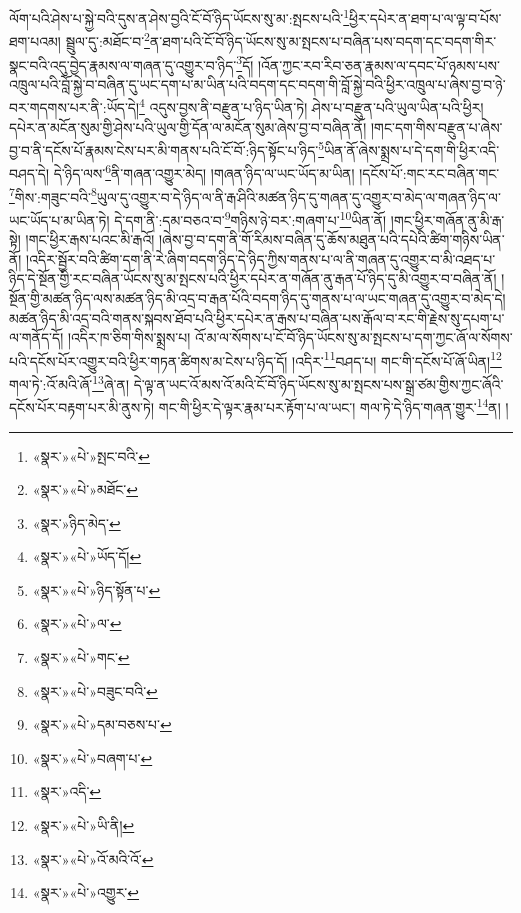 ལོག་པའི་ཤེས་པ་སྐྱེ་བའི་དུས་ན་ཤེས་བྱའི་ངོ་བོ་ཉིད་ཡོངས་སུ་མ་:སྤངས་པའི་\footnote{«སྣར་»«པེ་»སྤང་བའི་}ཕྱིར་དཔེར་ན་ཐག་པ་ལ་ལྟ་བ་པོས་ཐག་པའམ། སྦྲུལ་དུ་:མཐོང་བ་\footnote{«སྣར་»«པེ་»མཐོང་}ན་ཐག་པའི་ངོ་བོ་ཉིད་ཡོངས་སུ་མ་སྤངས་པ་བཞིན་པས་བདག་དང་བདག་གིར་སྣང་བའི་འདུ་བྱེད་རྣམས་ལ་གཞན་དུ་འགྱུར་བ་ཉིད་\footnote{«སྣར་»ཉིད་མེད་}དོ། །འོན་ཀྱང་རབ་རིབ་ཅན་རྣམས་ལ་དབང་པོ་ཉམས་པས་འཁྲུལ་པའི་བློ་སྐྱེ་བ་བཞིན་དུ་ཡང་དག་པ་མ་ཡིན་པའི་བདག་དང་བདག་གི་བློ་སྐྱེ་བའི་ཕྱིར་འཁྲུལ་པ་ཞེས་བྱ་བ་ཉེ་བར་གདགས་པར་ནི་:ཡོད་དེ།\footnote{«སྣར་»«པེ་»ཡོད་དོ།} འདུས་བྱས་ནི་བརྫུན་པ་ཉིད་ཡིན་ཏེ། ཤེས་པ་བརྫུན་པའི་ཡུལ་ཡིན་པའི་ཕྱིར། དཔེར་ན་མངོན་སུམ་གྱི་ཤེས་པའི་ཡུལ་གྱི་དོན་ལ་མངོན་སུམ་ཞེས་བྱ་བ་བཞིན་ནོ། །གང་དག་གིས་བརྫུན་པ་ཞེས་བྱ་བ་ནི་དངོས་པོ་རྣམས་ངེས་པར་མི་གནས་པའི་ངོ་བོ་:ཉིད་སྟོང་པ་ཉིད་\footnote{«སྣར་»«པེ་»ཉིད་སྟོན་པ་}ཡིན་ནོ་ཞེས་སྨྲས་པ་དེ་དག་གི་ཕྱིར་འདི་བཤད་དེ། དེ་ཉིད་ལས་\footnote{«སྣར་»«པེ་»ལ་}ནི་གཞན་འགྱུར་མེད། །གཞན་ཉིད་ལ་ཡང་ཡོད་མ་ཡིན། །དངོས་པོ་:གང་རང་བཞིན་གང་\footnote{«སྣར་»«པེ་»གང་}གིས་:གཟུང་བའི་\footnote{«སྣར་»«པེ་»བཟུང་བའི་}ཡུལ་དུ་འགྱུར་བ་དེ་ཉིད་ལ་ནི་རྒ་ཤིའི་མཚན་ཉིད་དུ་གཞན་དུ་འགྱུར་བ་མེད་ལ་གཞན་ཉིད་ལ་ཡང་ཡོད་པ་མ་ཡིན་ཏེ། དེ་དག་ནི་:དམ་བཅའ་བ་\footnote{«སྣར་»«པེ་»དམ་བཅས་པ་}གཉིས་ཉེ་བར་:གཞག་པ་\footnote{«སྣར་»«པེ་»བཞག་པ་}ཡིན་ནོ། །གང་ཕྱིར་གཞོན་ནུ་མི་རྒ་སྟེ། །གང་ཕྱིར་རྒས་པའང་མི་རྒའོ། །ཞེས་བྱ་བ་དག་ནི་གོ་རིམས་བཞིན་དུ་ཆོས་མཐུན་པའི་དཔེའི་ཚིག་གཉིས་ཡིན་ནོ། །འདིར་སྦྱོར་བའི་ཚིག་དག་ནི་རེ་ཞིག་བདག་ཉིད་དེ་ཉིད་ཀྱིས་གནས་པ་ལ་ནི་གཞན་དུ་འགྱུར་བ་མི་འཐད་པ་ཉིད་དེ་སྔོན་གྱི་རང་བཞིན་ཡོངས་སུ་མ་སྤངས་པའི་ཕྱིར་དཔེར་ན་གཞོན་ནུ་རྒན་པོ་ཉིད་དུ་མི་འགྱུར་བ་བཞིན་ནོ། །སྔོན་གྱི་མཚན་ཉིད་ལས་མཚན་ཉིད་མི་འདྲ་བ་རྒན་པོའི་བདག་ཉིད་དུ་གནས་པ་ལ་ཡང་གཞན་དུ་འགྱུར་བ་མེད་དེ། མཚན་ཉིད་མི་འདྲ་བའི་གནས་སྐབས་ཐོབ་པའི་ཕྱིར་དཔེར་ན་རྒས་པ་བཞིན་པས་རྒོལ་བ་རང་གི་རྗེས་སུ་དཔག་པ་ལ་གནོད་དོ། །འདིར་ཁ་ཅིག་གིས་སྨྲས་པ། འོ་མ་ལ་སོགས་པ་ངོ་བོ་ཉིད་ཡོངས་སུ་མ་སྤངས་པ་དག་ཀྱང་ཞོ་ལ་སོགས་པའི་དངོས་པོར་འགྱུར་བའི་ཕྱིར་གཏན་ཚིགས་མ་ངེས་པ་ཉིད་དོ། །འདིར་\footnote{«སྣར་»འདི་}བཤད་པ། གང་གི་དངོས་པོ་ཞོ་ཡིན།\footnote{«སྣར་»«པེ་»ཡི་ནི།} གལ་ཏེ་:འོ་མའི་ཞོ་\footnote{«སྣར་»«པེ་»འོ་མའི་འོ་}ཞེ་ན། དེ་ལྟ་ན་ཡང་འོ་མས་འོ་མའི་ངོ་བོ་ཉིད་ཡོངས་སུ་མ་སྤངས་པས་སྒྲ་ཙམ་གྱིས་ཀྱང་ཞོའི་དངོས་པོར་བརྟག་པར་མི་ནུས་ཏེ། གང་གི་ཕྱིར་དེ་ལྟར་རྣམ་པར་རྟོག་པ་ལ་ཡང་། གལ་ཏེ་དེ་ཉིད་གཞན་གྱུར་\footnote{«སྣར་»«པེ་»འགྱུར་}ན། །
